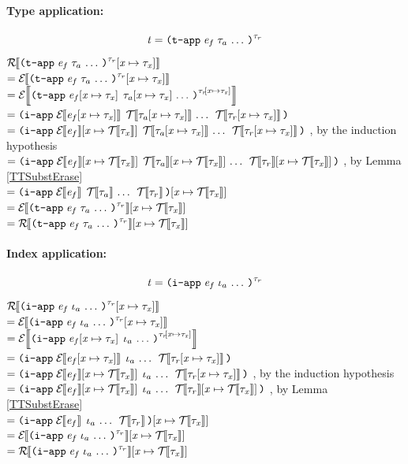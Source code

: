 \begin{sproof}
  \paragraph{Type application:}
  \[\term = \notedtapp[\type_r]{\expr_f}{\sequence{\type_a}}\]
  $\EraseTrm{\typesubst{\notedtapp[\type_r]{\expr_f}{\sequence{\type_a}}}}$ \\
  $= \EraseE{\typesubst{\notedtapp[\type_r]{\expr_f}{\sequence{\type_a}}}}$ \\
  $= \EraseE{\notedtapp[\typesubst{\type_r}]{\typesubst{\expr_f}}{\sequence{\typesubst{\type_a}}}}$ \\
  $= \iapp{\EraseE{\typesubst{\expr_f}}}{\sequence
    {\EraseT{\typesubst{\type_a}}}\;\EraseT{\typesubst{\type_r}}}$ \\
  $= \iapp{\etypesubst{\EraseE{\expr_f}}}{\sequence
    {\EraseT{\typesubst{\type_a}}}\;\EraseT{\typesubst{\type_r}}}$%
  , by the induction hypothesis \\
  $= \iapp{\etypesubst{\EraseE{\expr_f}}}{\sequence
    {\etypesubst{\EraseT{\type_a}}}\;\etypesubst{\EraseT{\type_r}}}$%
  , by Lemma \ref{TTSubstErase} \\
  $= \etypesubst{\iapp{\EraseE{\expr_f}}{\sequence
      {\EraseT{\type_a}}\;\EraseT{\type_r}}}$ \\
  $= \etypesubst{\EraseE{\notedtapp[\type_r]{\expr_f}{\sequence{\type_a}}}}$ \\
  $= \etypesubst{\EraseTrm{\notedtapp[\type_r]{\expr_f}{\sequence{\type_a}}}}$ \\

  \paragraph{Index application:}
  \[\term = \notediapp[\type_r]{\expr_f}{\sequence{\idx_a}}\]
  $\EraseTrm{\typesubst{\notediapp[\type_r]{\expr_f}{\sequence{\idx_a}}}}$ \\
  $= \EraseE{\typesubst{\notediapp[\type_r]{\expr_f}{\sequence{\idx_a}}}}$ \\
  $= \EraseE{\notediapp[\typesubst{\type_r}]{\typesubst{\expr_f}}{\sequence{\idx_a}}}$ \\
  $= \iapp{\EraseE{\typesubst{\expr_f}}}{\sequence{\idx_a}\;\EraseT{\typesubst{\type_r}}}$ \\
  $= \iapp{\etypesubst{\EraseE{\expr_f}}}{\sequence{\idx_a}\;\EraseT{\typesubst{\type_r}}}$%
  , by the induction hypothesis\\
  $= \iapp{\etypesubst{\EraseE{\expr_f}}}{\sequence{\idx_a}\;\etypesubst{\EraseT{\type_r}}}$%
  , by Lemma \ref{TTSubstErase}\\
  $= \etypesubst{\iapp{\EraseE{\expr_f}}{\sequence{\idx_a}\;\EraseT{\type_r}}}$ \\
  $= \etypesubst{\EraseE{\notediapp[\type_r]{\expr_f}{\sequence{\idx_a}}}}$ \\
  $= \etypesubst{\EraseTrm{\notediapp[\type_r]{\expr_f}{\sequence{\idx_a}}}}$ \\


\end{sproof}
